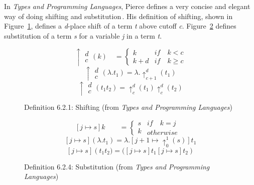 In \textit{Types and Programming Languages}, Pierce defines a very concise and elegant way of doing shifting and substitution\,\cite[pp. 79-80]{Pierce:TypeSystems}. His definition of shifting, shown in Figure~\ref{fig:Pierce-shifting}, defines a \textit{d}-place shift of a term \textit{t} above cutoff \textit{c}. Figure~\ref{fig:Pierce-substitution} defines substitution of a term \textit{s} for a variable \textit{j} in a term \textit{t}.

\begin{figure}
\[\uparrow \begin{matrix} d \\ c \end{matrix}(k)\quad = \begin{cases} k \\ k+d \end{cases}\begin{matrix} if\quad k < c \\ if\quad k \ge c \end{matrix}\]
\[\uparrow \begin{matrix} d \\ c \end{matrix}(\lambda .{ t }_{ 1 }) = \lambda .{ \uparrow  }_{ c+1 }^{ d }({ t }_{ 1 })\]
\[\uparrow \begin{matrix} d \\ c \end{matrix}({ t }_{ 1 }{ t }_{ 2 }) = { \uparrow  }_{ c }^{ d }({ t }_{ 1 }) { \uparrow  }_{ c }^{ d }({ t }_{ 2 })\]
\caption{Definition 6.2.1: Shifting (from \textit{Types and Programming Languages})}
\label{fig:Pierce-shifting}
\end{figure}

\begin{figure}
\[[j\mapsto s]k\quad\quad=\begin{cases} s \\ k \end{cases}\begin{matrix} if\quad k=j\quad \\ otherwise \end{matrix}\]
\[[j\mapsto s](\lambda .{ t }_{ 1 })=\lambda .[j+1\mapsto { \uparrow  }_{ 0 }^{ 1 }(s)]{ t }_{ 1 }\]
\[[j\mapsto s]({ { t }_{ 1 }{ t }_{ 2 })=( }[j\mapsto s]{ t }_{ 1 }[j\mapsto s]{ t }_{ 2 })\]
\caption{Definition 6.2.4: Substitution (from \textit{Types and Programming Languages})}
\label{fig:Pierce-substitution}
\end{figure}

